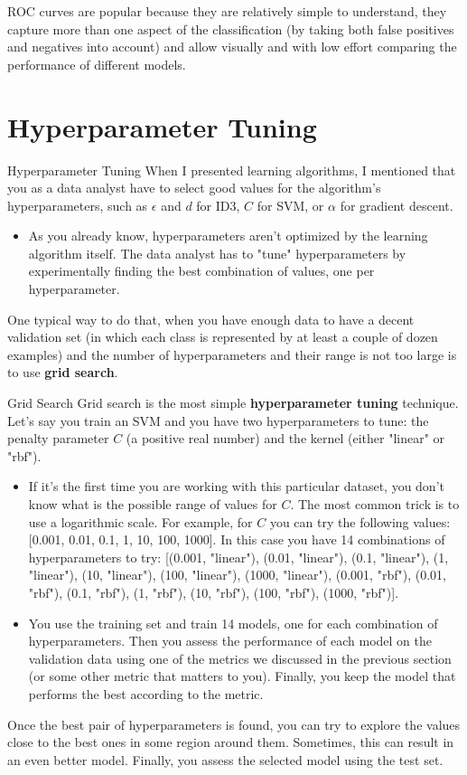 \documentclass[8pt,dvipsnames]{beamer}
\begin{document}
\begin{frame}
	ROC curves are popular because they are relatively simple to understand, they capture more than one aspect of the classification (by taking both false positives and negatives into account) and allow visually and with low effort comparing the performance of different models.
\end{frame}

\section{Hyperparameter Tuning}
\begin{frame}{Hyperparameter Tuning}
	When I presented learning algorithms, I mentioned that you as a data analyst have to select good values for the algorithm's hyperparameters, such as $\epsilon$ and $d$ for ID3, $C$ for SVM, or $\alpha$ for gradient descent.
	\begin{itemize}
		\item As you already know, hyperparameters aren't optimized by the learning algorithm itself. The data analyst has to "tune" hyperparameters by experimentally finding the best combination of values, one per hyperparameter.
	\end{itemize}
	One typical way to do that, when you have enough data to have a decent validation set (in which each class is represented by at least a couple of dozen examples) and the number of hyperparameters and their range is not too large is to use \textbf{grid search}.
\end{frame}
\begin{frame}{Grid Search}
	Grid search is the most simple \textbf{hyperparameter tuning} technique. Let's say you train an SVM and you have two hyperparameters to tune: the penalty parameter $C$ (a positive real number) and the kernel (either "linear" or "rbf").
	\begin{itemize}
		\item If it's the first time you are working with this particular dataset, you don't know what is the possible range of values for $C$. The most common trick is to use a logarithmic scale. For example, for $C$ you can try the following values: [0.001, 0.01, 0.1, 1, 10, 100, 1000]. In this case you have 14 combinations of hyperparameters to try: [(0.001, "linear"), (0.01, "linear"), (0.1, "linear"), (1, "linear"), (10, "linear"), (100, "linear"), (1000, "linear"), (0.001, "rbf"), (0.01, "rbf"), (0.1, "rbf"), (1, "rbf"), (10, "rbf"), (100, "rbf"), (1000, "rbf")].
		\item You use the training set and train 14 models, one for each combination of hyperparameters. Then you assess the performance of each model on the validation data using one of the metrics we discussed in the previous section (or some other metric that matters to you). Finally, you keep the model that performs the best according to the metric.
	\end{itemize}
	Once the best pair of hyperparameters is found, you can try to explore the values close to the best ones in some region around them. Sometimes, this can result in an even better model. Finally, you assess the selected model using the test set.
\end{frame}
\end{document}
